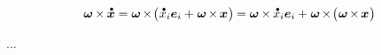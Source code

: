\begin{otherlanguage}{russian}
\begin{equation*}
\bm{\omega} \hspace{-0.12ex} \times \hspace{-0.12ex} \mathdotabove{\bm{x}}
= \bm{\omega} \hspace{-0.2ex} \times \hspace{-0.33ex} \bigl( \hspace{.1ex} \mathdotabove{x}_i \bm{e}_i + \hspace{.1ex} \bm{\omega} \hspace{-0.2ex} \times \hspace{-0.2ex} \bm{x} \hspace{.1ex} \bigr) \hspace{-0.15ex}
= \hspace{-0.2ex} \tikzmark{beginCoriolisHalf} \hspace{.2ex} \bm{\omega} \hspace{-0.1ex} \times \hspace{-0.1ex} \mathdotabove{x}_i \bm{e}_i \hspace{.2ex} \tikzmark{endCoriolisHalf} \hspace{-0.25ex}
+ \hspace{.1ex} \bm{\omega} \hspace{-0.2ex} \times \hspace{-0.33ex} \bigl( \hspace{.1ex} \bm{\omega} \hspace{-0.2ex} \times \hspace{-0.2ex} \bm{x} \hspace{.1ex} \bigr)
\end{equation*}%

...

\end{otherlanguage}



